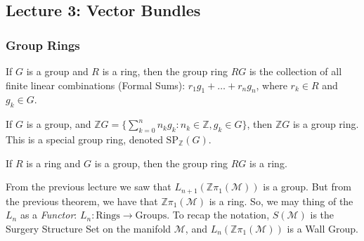 \documentclass[crop=false,class=book,oneside]{standalone}                      %
\begin{document}
    \subsection{Lecture 3: Vector Bundles}
        \subsubsection{Group Rings}
            \begin{definition}
                If $G$ is a group and $R$ is a ring, then the
                group ring $RG$ is the collection of all
                finite linear combinations (Formal Sums):
                $r_{1}g_{1}+\hdots+r_{n}g_{n}$, where
                $r_{k}\in{R}$ and $g_{k}\in{G}$.
            \end{definition}
            \begin{example}
                If $G$ is a group, and
                $\mathbb{Z}G=\{\sum_{k=0}^{n}n_{k}g_{k}:%
                 n_{k}\in\mathbb{Z},g_{k}\in{G}\}$, then
                $\mathbb{Z}G$ is a group ring. This is a
                special group ring, denoted
                $\textrm{SP}_{\mathbb{Z}}(G)$.
            \end{example}
            \begin{theorem}
                If $R$ is a ring and $G$ is a group, then
                the group ring $RG$ is a ring.
            \end{theorem}
            From the previous lecture we saw that
            $L_{n+1}(\mathbb{Z}\pi_{1}(\mathcal{M}))$ is
            a group. But from the previous theorem, we have
            that $\mathbb{Z}\pi_{1}(\mathcal{M})$ is a ring.
            So, we may thing of the $L_{n}$ as a \textit{Functor}:
            $L_{n}:\textrm{Rings}\rightarrow\textrm{Groups}$.
            To recap the notation, $S(\mathcal{M})$ is the
            Surgery Structure Set on the manifold
            $\mathcal{M}$, and
            $L_{n}(\mathbb{Z}\pi_{1}(\mathcal{M}))$ is
            a Wall Group.
\end{document}

